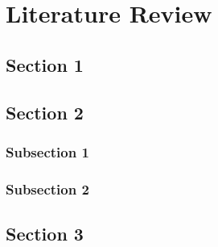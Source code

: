 \chapter{Literature Review}
	\lipsum[1-5]
\section{Section 1}
	\lipsum[1-5]
\section{Section 2}
	\lipsum[1-5]
\subsection{Subsection 1}
	\lipsum[1-8]
\subsection{Subsection 2}
	\lipsum[1-6]
\section{Section 3}
	\lipsum[1-5]